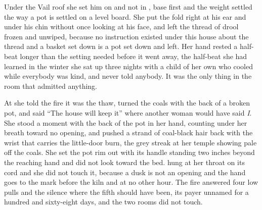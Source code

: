 Under the Vail roof she set him on  and not in , base first and the weight settled the way a pot is settled on a level board. She put the fold right at his ear and under his chin without once looking at his face, and left the thread of drool frozen and unwiped, because no instruction existed under this house about the thread and a basket set down is a pot set down and left. Her hand rested a half-beat longer than the setting needed before it went away, the half-beat she had learned in the winter she sat up three nights with a child of her own who cooled while everybody was kind, and never told anybody. It was the only thing in the room that admitted anything.

At  she told the fire it was the thaw, turned the coals with the back of a broken pot, and said “The house will keep it” where another woman would have said \emph{I}. She stood a moment with the back of the pot in her hand, counting under her breath toward no opening, and pushed a strand of coal-black hair back with the wrist that carries the little-door burn, the grey streak at her temple showing pale off the coals. She set the pot rim out with its handle standing two inches beyond the reaching hand and did not look toward the bed.  hung at her throat on its cord and she did not touch it, because a dusk is not an opening and the hand goes to the mark before the kiln and at no other hour. The fire answered four low pulls and the silence where the fifth should have been, its payer unnamed for a hundred and sixty-eight days, and the two rooms did not touch.


